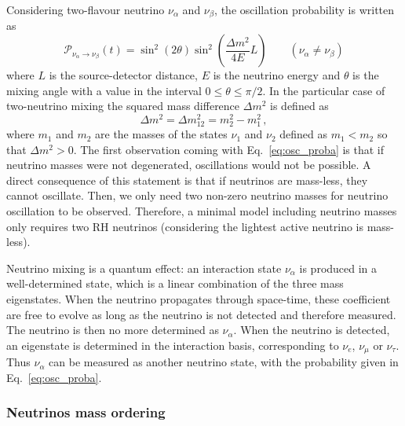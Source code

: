 Considering two-flavour neutrino $\nu_{\alpha}$ and $\nu_{\beta}$, the oscillation probability is written as
\begin{equation}
  \mathcal{P}_{\nu_{\alpha}\rightarrow \nu_{\beta}}(t)=\sin^{2}({2\theta})\sin^{2}\left({\frac{\Delta m^2}{4E}}L\right)\qquad (\nu_{\alpha}\neq\nu_{\beta})
  \label{eq:osc_proba}
\end{equation}
where $L$ is the source-detector distance, $E$ is the neutrino energy and $\theta$ is the mixing angle with a value in the interval ${0\leq\theta\leq\pi/2}$.
In the particular case of two-neutrino mixing the squared mass difference $\Delta m^2$ is defined as
\begin{equation}
\Delta m^2=\Delta m_{12}^2=m_2^2-m_1^2\,,
\end{equation}
where $m_1$ and $m_2$ are the masses of the states $\nu_1$ and $\nu_2$ defined as $m_1<m_2$ so that $\Delta m^2>0$.
The first observation coming with Eq.~\eqref{eq:osc_proba} is that if neutrino masses were not degenerated, oscillations would not be possible.
A direct consequence of this statement is that if neutrinos are mass-less, they cannot oscillate.
Then, we only need two non-zero neutrino masses for neutrino oscillation to be observed.
Therefore, a minimal model including neutrino masses only requires two RH neutrinos (considering the lightest active neutrino is mass-less).

Neutrino mixing is a quantum effect: an interaction state $\nu_{\alpha}$ is produced in a well-determined state, which is a linear combination of the three mass eigenstates.
When the neutrino propagates through space-time, these coefficient are free to evolve as long as the neutrino is not detected and therefore measured.
The neutrino is then no more determined as $\nu_{\alpha}$.
When the neutrino is detected, an eigenstate is determined in the interaction basis, corresponding to $\nu_e$, $\nu_{\mu}$ or $\nu_{\tau}$.
Thus $\nu_{\alpha}$ can be measured as another neutrino state, with the probability given in Eq.~\eqref{eq:osc_proba}.

\subsubsection*{Neutrinos mass ordering}

